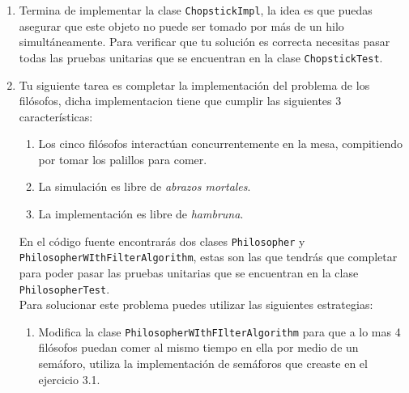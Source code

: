 \documentclass[a4paper,11pt]{article}
\begin{document}
    \begin{enumerate}
		\item{Termina de implementar la clase \verb|ChopstickImpl|, la idea es que puedas asegurar que este objeto no puede ser tomado por más de un hilo simultáneamente. Para verificar que tu solución es correcta necesitas pasar todas las pruebas unitarias que se encuentran en la clase \verb|ChopstickTest|.
		}
		\item{Tu siguiente tarea es completar la implementación del problema de los filósofos, dicha implementacion tiene que cumplir las siguientes 3 características:
		    \begin{enumerate}
		        \item{Los cinco filósofos interactúan concurrentemente en la mesa, compitiendo por tomar los palillos para comer.}
		        \item{La simulación es libre de \emph{abrazos mortales}.}
		        \item{La implementación es libre de \emph{hambruna}.}
		    \end{enumerate}
		    En el código fuente encontrarás dos clases \verb|Philosopher| y  \verb|PhilosopherWIthFilterAlgorithm|, estas son las que tendrás que completar para poder pasar las pruebas unitarias que se encuentran en la clase \verb|PhilosopherTest|.\\
		    Para solucionar este problema puedes utilizar las siguientes estrategias:
		    \begin{enumerate}
				\item{Modifica la clase \verb|PhilosopherWIthFIlterAlgorithm| para que a lo mas 4 filósofos puedan comer al mismo tiempo en ella por medio de un semáforo, utiliza la implementación de semáforos que creaste en el ejercicio 3.1.}
		    \end{enumerate}
		    }
		
	\end{enumerate}
\end{document}
